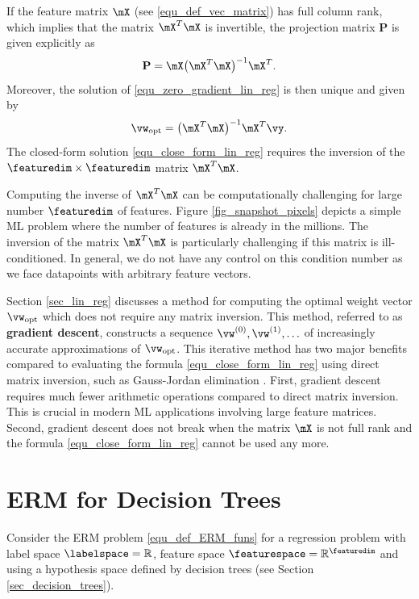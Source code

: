 \documentclass[12pt]{report}
\begin{document}
If the feature matrix $\mX$ (see \eqref{equ_def_vec_matrix}) has full column rank, 
which implies that the matrix $\mX^{T} \mX$ is invertible, the projection matrix $\mathbf{P}$ 
is given explicitly as 
\begin{equation} 
\nonumber
\mathbf{P} = \mX \big( \mX^{T} \mX \big)^{-1} \mX^{T}. 
\end{equation} 
Moreover, the solution of \eqref{equ_zero_gradient_lin_reg} is then unique and given by 
\begin{equation}
\label{equ_close_form_lin_reg}
\vw_{\rm opt} = \big(  \mX^{T} \mX \big)^{-1} \mX^{T} \vy. 
\end{equation}
The closed-form solution \eqref{equ_close_form_lin_reg} requires 
the inversion of the $\featuredim \times \featuredim$ matrix $\mX^{T} \mX$. 

Computing the inverse of $\mX^{T} \mX$ can be computationally challenging 
for large number $\featuredim$ of features. Figure \ref{fig_snapshot_pixels} 
depicts a simple ML problem where the number of features is already 
in the millions. The inversion of the matrix $\mX^{T} \mX$ is particularly 
challenging if this matrix is ill-conditioned. In general, we do not have 
any control on this condition number as we face datapoints with arbitrary 
feature vectors. 

Section \ref{sec_lin_reg} discusses a method for computing the optimal weight vector 
$\vw_{\rm opt}$ which does not require any matrix inversion. This method, 
referred to as {\bf gradient descent}, constructs a sequence 
$\vw^{(0)}, \vw^{(1)},\ldots$ of increasingly accurate approximations 
of $\vw_{\rm opt}$. This iterative method has two major benefits 
compared to evaluating the formula \eqref{equ_close_form_lin_reg} using 
direct matrix inversion, such as Gauss-Jordan elimination \cite{golub96}. 
First, gradient descent requires much fewer arithmetic operations compared 
to direct matrix inversion. This is crucial in modern ML applications involving 
large feature matrices. Second, gradient descent does not break when the 
matrix $\mX$ is not full rank and the formula \eqref{equ_close_form_lin_reg} 
cannot be used any more. 

\section{ERM for Decision Trees}
\label{sec_ERM_decision_tree}

Consider the ERM problem \eqref{equ_def_ERM_funs} for a regression 
problem with label space $\labelspace=\mathbb{R}$, feature space 
$\featurespace= \mathbb{R}^{\featuredim}$ and using a hypothesis 
space defined by decision trees (see Section \ref{sec_decision_trees}). 
\end{document}

